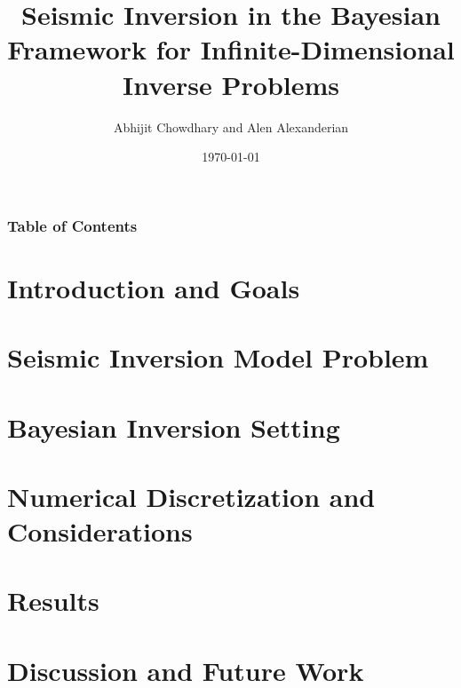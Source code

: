 \documentclass[
    pdf,
    11pt,
    xcolor={svgnames},
  ]{beamer}
\title[%
  Seismic Inversion in the Bayesian Framework
]{%
  Seismic Inversion in the Bayesian Framework for Infinite-Dimensional Inverse
  Problems
}
\author[Chowdhary, Alexanderian]{%
  Abhijit Chowdhary and Alen Alexanderian
}
\institute[NCSU]{
  Department of Mathematics \\
  North Carolina State University
}
\date[AMGSS 2022]{\today}
\begin{document}
 

\begin{frame}
  \frametitle{Table of Contents}
  \tableofcontents
\end{frame}

\section{Introduction and Goals}

\section{Seismic Inversion Model Problem}

\section{Bayesian Inversion Setting}

\section{Numerical Discretization and Considerations}

\section{Results}

\section{Discussion and Future Work}
\end{document}
